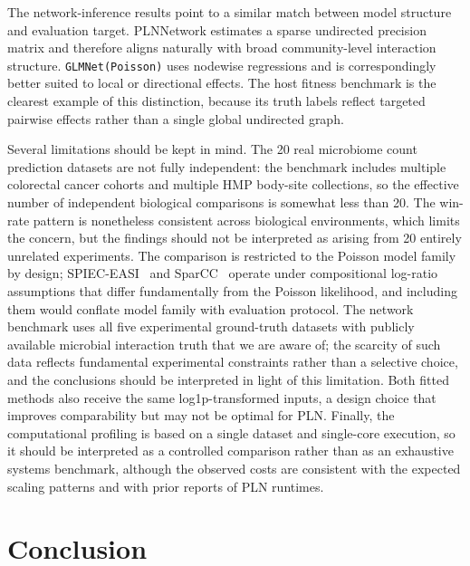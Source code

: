 \documentclass[useAMS,usenatbib,referee]{biom}
\begin{document}
The network-inference results point to a similar match between model structure and evaluation target.
PLNNetwork estimates a sparse undirected precision matrix and therefore aligns naturally with broad community-level interaction structure.
\texttt{GLMNet(Poisson)} uses nodewise regressions and is correspondingly better suited to local or directional effects.
The host fitness benchmark is the clearest example of this distinction, because its truth labels reflect targeted pairwise effects rather than a single global undirected graph.

Several limitations should be kept in mind.
The 20 real microbiome count prediction datasets are not fully independent: the benchmark includes multiple colorectal cancer cohorts and multiple HMP body-site collections, so the effective number of independent biological comparisons is somewhat less than 20.
The win-rate pattern is nonetheless consistent across biological environments, which limits the concern, but the findings should not be interpreted as arising from 20 entirely unrelated experiments.
The comparison is restricted to the Poisson model family by design; SPIEC-EASI~\citep{Kurtz2015SPIECEASI} and SparCC~\citep{Friedman2012SparCC} operate under compositional log-ratio assumptions that differ fundamentally from the Poisson likelihood, and including them would conflate model family with evaluation protocol.
The network benchmark uses all five experimental ground-truth datasets with publicly available microbial interaction truth that we are aware of; the scarcity of such data reflects fundamental experimental constraints rather than a selective choice, and the conclusions should be interpreted in light of this limitation.
Both fitted methods also receive the same log1p-transformed inputs, a design choice that improves comparability but may not be optimal for PLN.
Finally, the computational profiling is based on a single dataset and single-core execution, so it should be interpreted as a controlled comparison rather than as an exhaustive systems benchmark, although the observed costs are consistent with the expected scaling patterns and with prior reports of PLN runtimes.

\section{Conclusion}
\label{sec:conclusion}
\end{document}
